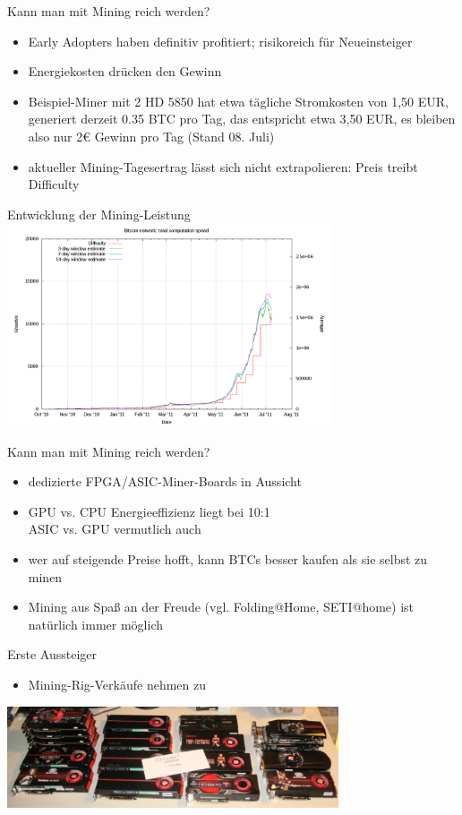 \documentclass[handout]{beamer} \usepackage[german]{babel}
\begin{document}
\begin{frame}{Kann man mit Mining reich werden?}
	\begin{itemize}
		\item Early Adopters haben definitiv profitiert; risikoreich für
			Neueinsteiger
		\item Energiekosten drücken den Gewinn
		\item Beispiel-Miner mit 2 HD 5850 hat etwa tägliche Stromkosten von 1,50 EUR, generiert derzeit
			0.35 BTC pro Tag, das entspricht etwa 3,50 EUR, es
			bleiben also nur 2€ Gewinn pro Tag (Stand 08. Juli)
		\item aktueller Mining-Tagesertrag lässt sich nicht extrapolieren: Preis
			treibt Difficulty
	\end{itemize}
\end{frame}

\begin{frame}{Entwicklung der Mining-Leistung}
	\includegraphics[height=60mm]{btcvortrag/speed-lin.png}
\end{frame}

\begin{frame}{Kann man mit Mining reich werden?}
	\begin{itemize}
		\item dedizierte FPGA/ASIC-Miner-Boards in Aussicht
		\item GPU vs. CPU Energieeffizienz liegt bei 10:1 \\
			ASIC vs. GPU vermutlich auch
		\item wer auf steigende Preise hofft, kann BTCs besser kaufen als sie
			selbst zu minen
		\item Mining aus Spaß an der Freude (vgl. Folding@Home, SETI@home)
			ist natürlich immer möglich
	\end{itemize}
\end{frame}

\begin{frame}{Erste Aussteiger}
	\begin{itemize}
		\item Mining-Rig-Verkäufe nehmen zu
	\end{itemize}
	\includegraphics[height=30mm]{btcvortrag/aussteiger.jpg}
\end{frame}
\end{document}

